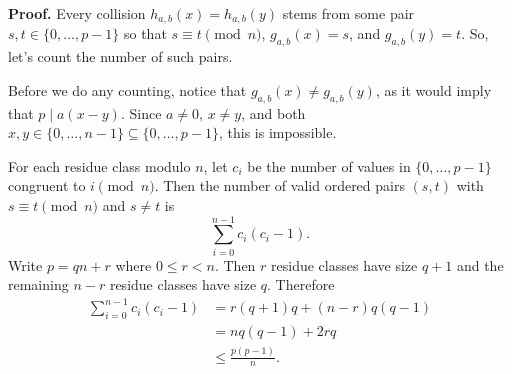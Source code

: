 \documentclass[14pt]{extreport}
\begin{document}
    \vspace{5mm}
    \textbf{Proof.} Every collision $h_{a, b}(x) = h_{a, b}(y)$ stems from some pair $s, t \in \{0, \dots, p - 1\}$ so that $s \equiv t \pmod{n}$, $g_{a, b}(x) = s$, and $g_{a, b}(y) = t$. So, let's count the number of such pairs.

    \vspace{5mm}
    Before we do any counting, notice that $g_{a, b}(x) \ne g_{a, b}(y)$, as it would imply that $p \mid a(x - y)$. Since $a \ne 0$, $x \ne y$, and both $x,y \in \{0,\dots,n-1\} \subseteq \{0,\dots,p-1\}$, this is impossible.

    \vspace{5mm}
    For each residue class modulo $n$, let $c_i$ be the number of values in $\{0,\dots,p-1\}$ congruent to $i \pmod n$. Then the number of valid ordered pairs $(s,t)$ with $s \equiv t \pmod n$ and $s \ne t$ is
    $$\sum_{i = 0}^{n-1} c_i(c_i - 1).$$
    Write $p = qn + r$ where $0 \le r < n$. Then $r$ residue classes have size $q+1$ and the remaining $n-r$ residue classes have size $q$. Therefore
    \begin{align*}
        \sum_{i = 0}^{n-1} c_i(c_i - 1)
        &= r(q+1)q + (n-r)q(q-1) \\
        &= nq(q-1) + 2rq \\
        &\le \frac{p(p-1)}{n}.
    \end{align*}
\end{document}
